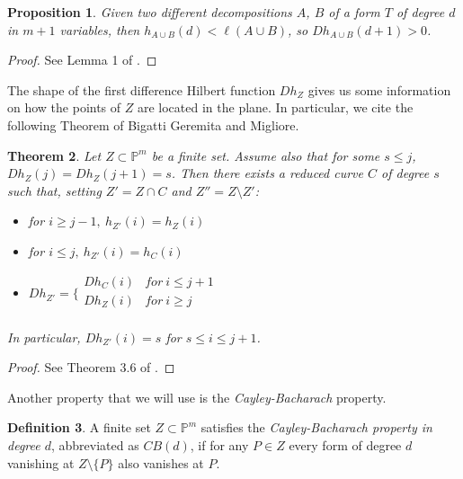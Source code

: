 \documentclass[a4paper,10pt,oneside]{article}
\theoremstyle{casep}
\newcommand{\Pj}{\mathbb{P}}
\newtheorem{theorem}{Theorem}[section]
\newtheorem{proposition}[theorem]{Proposition}
\theoremstyle{definition}
\newtheorem{definition}[theorem]{Definition}
\begin{document}
\begin{proposition} Given two different decompositions $A$, $B$ of a form $T$ of degree $ d $ in $ m+1 $ variables, then
$h_{A\cup B} (d) < \ell(A \cup B)$, so $Dh_{A \cup B} (d +1) > 0$.
\label{d+1}
\end{proposition}
\begin{proof} See Lemma 1 of \cite{BallBern12a}.


\end{proof}

The shape of the first difference Hilbert function $ Dh_Z $ gives us some information on how the points of $ Z $ are located in the plane. In particular, we cite the following Theorem of Bigatti Geremita and Migliore. 

\begin{theorem} \label{BGM} Let $ Z \subset \mathbb{P}^m$ be a finite set. Assume also that for some $ s \leq j$, $Dh_Z(j) = Dh_Z(j +1) = s $. Then there exists a reduced curve $C$ of degree $s$ such that, setting $Z'= Z \cap C$ and $Z'' = Z \setminus Z'$:
	\begin{itemize}
		\item for $i \geq j-1, \ h_{Z'}(i)=h_Z(i)$
		\item for $i \leq j, \ h_{Z'}(i)=h_C(i)$
		\smallskip
		\item $Dh_{Z'} = \bigg \{
		\begin{array}{rl}
		Dh_C(i) & for \ i \leq j+1 \\
		Dh_Z(i) & for \ i \geq j \\
		\end{array}$
		
	\end{itemize}
	In particular, $Dh_{Z'} (i) = s$ for $s \leq i \leq j + 1$.

\end{theorem}
\begin{proof} See Theorem 3.6 of \cite{tre}.
	
	
\end{proof}

Another property that we will use is the \emph{Cayley-Bacharach} property.

\begin{definition}\label{CB}
A finite set $Z\subset \Pj^m$ satisfies the \emph{Cayley-Bacharach property in degree $d$}, 
abbreviated as $CB(d)$, if for any $P \in Z$ every form of degree $d$ vanishing at $ Z\setminus\{ P\}$
also vanishes at $P$.
\end{definition}
\end{document}
